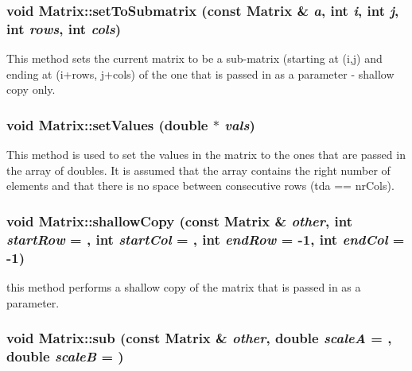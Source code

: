 \hypertarget{classCartWheel_1_1Math_1_1Matrix_a66059180667b010ff529c2320fee859f}{
\subsubsection[{setToSubmatrix}]{\setlength{\rightskip}{0pt plus 5cm}void Matrix::setToSubmatrix (const {\bf Matrix} \& {\em a}, \/  int {\em i}, \/  int {\em j}, \/  int {\em rows}, \/  int {\em cols})}}
\label{classCartWheel_1_1Math_1_1Matrix_a66059180667b010ff529c2320fee859f}
This method sets the current matrix to be a sub-\/matrix (starting at (i,j) and ending at (i+rows, j+cols) of the one that is passed in as a parameter -\/ shallow copy only. \hypertarget{classCartWheel_1_1Math_1_1Matrix_a879b543a840821660d869c820f4528a2}{
\subsubsection[{setValues}]{\setlength{\rightskip}{0pt plus 5cm}void Matrix::setValues (double $\ast$ {\em vals})}}
\label{classCartWheel_1_1Math_1_1Matrix_a879b543a840821660d869c820f4528a2}
This method is used to set the values in the matrix to the ones that are passed in the array of doubles. It is assumed that the array contains the right number of elements and that there is no space between consecutive rows (tda == nrCols). \hypertarget{classCartWheel_1_1Math_1_1Matrix_a06aa42f9aa88cbc2e1557e5d4cbc24ec}{
\subsubsection[{shallowCopy}]{\setlength{\rightskip}{0pt plus 5cm}void Matrix::shallowCopy (const {\bf Matrix} \& {\em other}, \/  int {\em startRow} = {}, \/  int {\em startCol} = {}, \/  int {\em endRow} = {\ttfamily -\/1}, \/  int {\em endCol} = {\ttfamily -\/1})}}
\label{classCartWheel_1_1Math_1_1Matrix_a06aa42f9aa88cbc2e1557e5d4cbc24ec}
this method performs a shallow copy of the matrix that is passed in as a parameter. \hypertarget{classCartWheel_1_1Math_1_1Matrix_a3e3cb8fbb2734f589230dc7914f7b586}{
\subsubsection[{sub}]{\setlength{\rightskip}{0pt plus 5cm}void Matrix::sub (const {\bf Matrix} \& {\em other}, \/  double {\em scaleA} = {}, \/  double {\em scaleB} = {})}}
